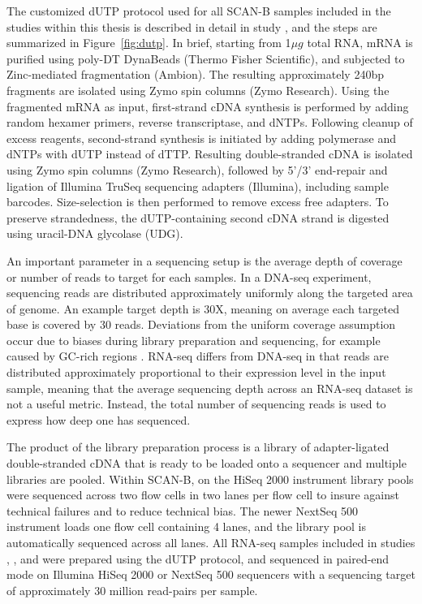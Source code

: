 \documentclass[11pt]{book}
\newcommand{\scanb}{\mbox{SCAN-B}}
\begin{document}
The customized dUTP protocol used for all \scanb{} samples included in the studies within this thesis is described in detail in study \I, and the steps are summarized in Figure~\ref{fig:dutp}. In brief, starting from 1$\mu{g}$ total RNA, mRNA is purified using poly-DT DynaBeads (Thermo Fisher Scientific), and subjected to Zinc-mediated fragmentation (Ambion). The resulting approximately 240bp fragments are isolated using Zymo spin columns (Zymo Research). Using the fragmented mRNA as input, first-strand cDNA synthesis is performed by adding random hexamer primers, reverse transcriptase, and dNTPs. Following cleanup of excess reagents, second-strand synthesis is initiated by adding polymerase and dNTPs with dUTP instead of dTTP. Resulting double-stranded cDNA is isolated using Zymo spin columns (Zymo Research), followed by 5'/3' end-repair and ligation of Illumina TruSeq sequencing adapters (Illumina), including sample barcodes. Size-selection is then performed to remove excess free adapters. To preserve strandedness, the dUTP-containing second cDNA strand is digested using uracil-DNA glycolase (UDG).

An important parameter in a sequencing setup is the average depth of coverage or number of reads to target for each samples. In a DNA-seq experiment, sequencing reads are distributed approximately uniformly along the targeted area of genome. An example target depth is 30X, meaning on average each targeted base is covered by 30 reads. Deviations from the uniform coverage assumption occur due to biases during library preparation and sequencing, for example caused by GC-rich regions \cite{Benjamini:2012, Ross:2013}. RNA-seq differs from DNA-seq in that reads are distributed approximately proportional to their expression level in the input sample, meaning that the average sequencing depth across an RNA-seq dataset is not a useful metric. Instead, the total number of sequencing reads is used to express how deep one has sequenced.

The product of the library preparation process is a library of adapter-ligated double-stranded cDNA that is ready to be loaded onto a sequencer and multiple libraries are pooled. Within \scanb{}, on the HiSeq 2000 instrument library pools were sequenced across two flow cells in two lanes per flow cell to insure against technical failures and to reduce technical bias. The newer NextSeq 500 instrument loads one flow cell containing 4 lanes, and the library pool is automatically sequenced across all lanes. All RNA-seq samples included in studies \I, \III, and \IV were prepared using the dUTP protocol, and sequenced in paired-end mode on Illumina HiSeq 2000 or NextSeq 500 sequencers with a sequencing target of approximately 30 million read-pairs per sample.
\end{document}
